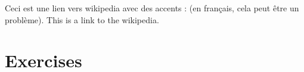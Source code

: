 \documentclass[a4paper,12pt]{book}
\begin{document}

Ceci est une lien vers wikipedia avec des accents :  (en français, cela peut être un problème). This is a link to the  wikipedia.

\chapter{Exercises}


\end{document}
